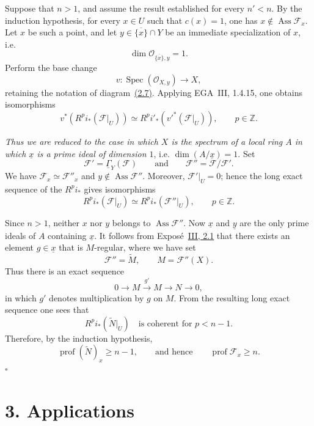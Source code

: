 \documentclass[11pt,a4paper,oneside]{book}
\providecommand{\SheafGamma}{\underline{\Gamma}}
\providecommand{\cF}{\mathcal F}
\providecommand{\cO}{\mathcal O}
\providecommand{\Ass}{\operatorname{Ass}}
\providecommand{\Spec}{\operatorname{Spec}}
\providecommand{\prof}{\operatorname{prof}}
\theoremstyle{plain}
\theoremstyle{definition}
\theoremstyle{remark}
\begin{document}

\medskip
\noindent Suppose that $n>1$, and assume the result established for every
$n'<n$. By the induction hypothesis, for every $x\in U$ such that $c(x)=1$,
one has $x\notin\Ass\cF_x$. Let $x$ be such a point, and let
$y\in\overline{\{x\}}\cap Y$ be an immediate specialization of $x$, i.e.
\[
  \dim\cO_{\overline{\{x\}},y}=1.
\]
Perform the base change
\[
  v\colon\Spec(\cO_{X,y})\longrightarrow X,
\]
retaining the notation of diagram~\textup{\hyperref[eq:VIII.2.7]{(2.7)}}. Applying EGA~III, 1.4.15,
one obtains isomorphisms
\[
  v^*(R^p i_*(\cF|_U))
  \simeq
  R^p i'_*(v'^*(\cF|_U)),
  \qquad p\in\mathbb Z.
\]

\noindent\emph{Thus we are reduced to the case in which $X$ is the spectrum
of a local ring $A$ in which $\underline{x}$ is a prime ideal of dimension
$1$}, i.e. $\dim(A/\underline{x})=1$. Set
\[
  \cF'=\SheafGamma_Y(\cF)
  \qquad\text{and}\qquad
  \cF''=\cF/\cF'.
\]
We have $\cF_x\simeq\cF''_x$ and $y\notin\Ass\cF''$. Moreover,
$\cF'|_U=0$; hence the long exact sequence of the $R^p i_*$ gives
isomorphisms
\[
  R^p i_*(\cF|_U)
  \simeq
  R^p i_*(\cF''|_U),
  \qquad p\in\mathbb Z.
\]

\quad Since $n>1$,
neither $x$ nor $y$ belongs to $\Ass\cF''$. Now $\underline{x}$ and
$\underline{y}$ are the only prime ideals of $A$ containing $\underline{x}$.
It follows from Expos\'e~\hyperref[III.2.1]{III, 2.1} that there exists an element
$g\in\underline{x}$ that is $M$-regular, where we have set
\[
  \cF''=\widetilde M,
  \qquad M=\cF''(X).
\]
Thus there is an exact sequence
\[
  0\longrightarrow M\xrightarrow{g'}M\longrightarrow N\longrightarrow0,
\]
in which $g'$ denotes multiplication by $g$ on $M$. From the resulting long
exact sequence one sees that
\[
  R^p i_*(\widetilde N|_U)
  \quad\text{is coherent for }p<n-1.
\]
Therefore, by the induction hypothesis,
\[
  \prof(\widetilde N)_x\geq n-1,
  \qquad\text{and hence}\qquad
  \prof\cF_x\geq n.
\]
\hfill$\square$


\section*{3. Applications}
\end{document}
